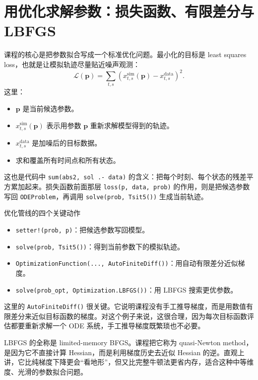\documentclass[a4paper]{article}
\begin{document}
\section{用优化求解参数：损失函数、有限差分与 LBFGS}
课程的核心是把参数拟合写成一个标准优化问题。最小化的目标是 least squares loss，也就是让模拟轨迹尽量贴近噪声观测：
\begin{equation}
\mathcal L(\mathbf p)
= \sum_{t,s}\left(x^{\mathrm{sim}}_{t,s}(\mathbf p)-x^{\mathrm{data}}_{t,s}\right)^2.
\end{equation}
这里：
\begin{itemize}
    \item $\mathbf p$ 是当前候选参数。
    \item $x^{\mathrm{sim}}_{t,s}(\mathbf p)$ 表示用参数 $\mathbf p$ 重新求解模型得到的轨迹。
    \item $x^{\mathrm{data}}_{t,s}$ 是加噪后的目标数据。
    \item 求和覆盖所有时间点和所有状态。
\end{itemize}

这也是代码中 \texttt{sum(abs2, sol .- data)} 的含义：把每个时刻、每个状态的残差平方累加起来。损失函数前面那层 \texttt{loss(p, data, prob)} 的作用，则是把候选参数写回 \texttt{ODEProblem}，再调用 \texttt{solve(prob, Tsit5())} 生成当前轨迹。

\begin{importantbox}{优化管线的四个关键动作}
\begin{itemize}
    \item \texttt{setter!(prob, p)}：把候选参数写回模型。
    \item \texttt{solve(prob, Tsit5())}：得到当前参数下的模拟轨迹。
    \item \texttt{OptimizationFunction(..., AutoFiniteDiff())}：用自动有限差分近似梯度。
    \item \texttt{solve(prob\_opt, Optimization.LBFGS())}：用 LBFGS 搜索更优参数。
\end{itemize}
\end{importantbox}

这里的 \texttt{AutoFiniteDiff()} 很关键。它说明课程没有手工推导梯度，而是用数值有限差分来近似目标函数的梯度。对这个例子来说，这很合理，因为每次目标函数评估都要重新求解一个 ODE 系统，手工推导梯度既繁琐也不必要。

LBFGS 的全称是 limited-memory BFGS。课程把它称为 quasi-Newton method，是因为它不直接计算 Hessian，而是利用梯度历史去近似 Hessian 的逆。直观上讲，它比纯梯度下降更会“看地形”，但又比完整牛顿法更省内存，适合这种中等维度、光滑的参数拟合问题。
\end{document}
